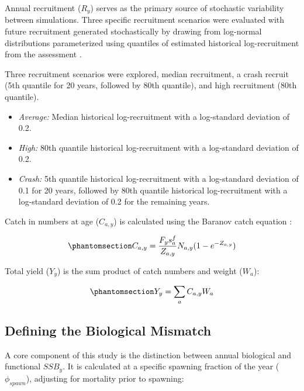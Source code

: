 \documentclass[
  authoryear,
  preprint,
  3p]{elsarticle}
\providecommand{\tightlist}{%
  \setlength{\itemsep}{0pt}\setlength{\parskip}{0pt}}
\begin{document}
Annual recruitment (\(R_y\)) serves as the primary source of stochastic
variability between simulations. Three specific recruitment scenarios
were evaluated with future recruitment generated stochastically by
drawing from log-normal distributions parameterized using quantiles of
estimated historical log-recruitment from the assessment
\citep{Williams2023}.

Three recruitment scenarios were explored, median recruitment, a crash
recruit (5th quantile for 20 years, followed by 80th quantile), and high
recruitment (80th quantile).

\begin{itemize}
\tightlist
\item
  \emph{Average:} Median historical log-recruitment with a log-standard
  deviation of 0.2.
\item
  \emph{High:} 80th quantile historical log-recruitment with a
  log-standard deviation of 0.2.
\item
  \emph{Crash:} 5th quantile historical log-recruitment with a
  log-standard deviation of 0.1 for 20 years, followed by 80th quantile
  historical log-recruitment with a log-standard deviation of 0.2 for
  the remaining years.
\end{itemize}

Catch in numbers at age (\(C_{a,y}\)) is calculated using the Baranov
catch equation \citep{Branch2009}:

\begin{equation}\protect\phantomsection\label{eq-catch}{
C_{a,y} = \frac{F_y s^{f}_a}{Z_{a,y}} N_{a,y} (1 - e^{-Z_{a,y}})
}\end{equation}

Total yield (\(Y_y\)) is the sum product of catch numbers and weight
(\(W_a\)):

\begin{equation}\protect\phantomsection\label{eq-yield}{
Y_y = \sum_{a} C_{a,y} W_a
}\end{equation}

\subsection{Defining the Biological
Mismatch}\label{defining-the-biological-mismatch}

A core component of this study is the distinction between annual
biological and functional \(SSB_y\). It is calculated at a specific
spawning fraction of the year (\(\phi_{spawn}\)), adjusting for
mortality prior to spawning:
\end{document}
